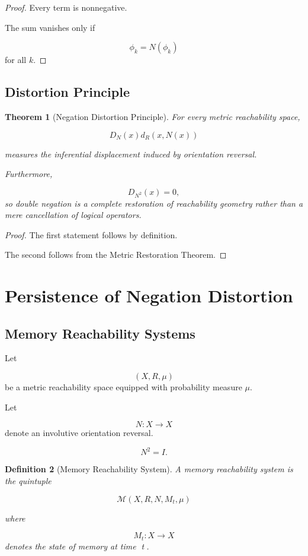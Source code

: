 \documentclass[12pt]{article}
\newtheorem{theorem}{Theorem}[section]
\newtheorem{definition}[theorem]{Definition}
\theoremstyle{remark}
\begin{document}
\begin{proof}
Every term is nonnegative.

The sum vanishes only if

\[
\phi_k=N(\phi_k)
\]
for all \(k\).
\end{proof}

\subsection{Distortion Principle}

\begin{theorem}[Negation Distortion Principle]
For every metric reachability space,

\[
D_N(x)
d_R(x,N(x))
\]

measures the inferential displacement induced by orientation reversal.

Furthermore,

\[
D_{N^2}(x)=0,
\]
so double negation is a complete restoration of reachability geometry rather than a mere cancellation of logical operators.
\end{theorem}

\begin{proof}
The first statement follows by definition.

The second follows from the Metric Restoration Theorem.
\end{proof}

\section{Persistence of Negation Distortion}

\subsection{Memory Reachability Systems}

Let

\[
(X,R,\mu)
\]
be a metric reachability space equipped with probability measure \(\mu\).

Let

\[
N:X\rightarrow X
\]
denote an involutive orientation reversal.

\[
N^2=I.
\]
\begin{definition}[Memory Reachability System]
A memory reachability system is the quintuple

\[
\mathcal M
(X,R,N,M_t,\mu)
\]

where

\[
M_t:X\rightarrow X
\]
denotes the state of memory at time t.
\]
\end{definition}
\end{document}
